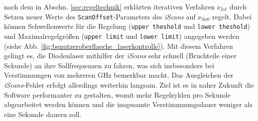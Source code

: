 nach dem in Abschn. \ref{sec:regeltechnik} erklärten iterativen Verfahren
$\nu_{Ist}$ durch Setzen neuer Werte des
\lstinline|ScanOffset|-Parameters des \textit{iScans} auf $\nu_{Soll}$ regelt.
Dabei können Schwellenwerte für die Regelung (\lstinline|upper theshold| und
\lstinline|lower theshold|) und Maximalregelgrößen (\lstinline|upper limit| und
\lstinline|lower limit|) angegeben werden (siehe Abb.
\ref{fig:benutzeroberflaeche_laserkontrolle}). Mit diesem Verfahren gelingt es,
die Diodenlaser mithilfer der \textit{iScans} sehr schnell (Bruchteile einer
Sekunde) an ihre Sollfrequenzen zu fahren, was sich insbesondere bei
Verstimmungen von mehreren GHz bemerkbar macht. Das Ausgleichen der
\textit{iScans}-Fehler erfolgt allerdings weiterhin langsam. Ziel ist es
in naher Zukunft die Software performanter zu gestalten, womit mehr
Regelzyklen pro Sekunde abgearbeitet werden können und die insgesamte
Verstimmnungsdauer weniger als eine Sekunde dauern soll.

